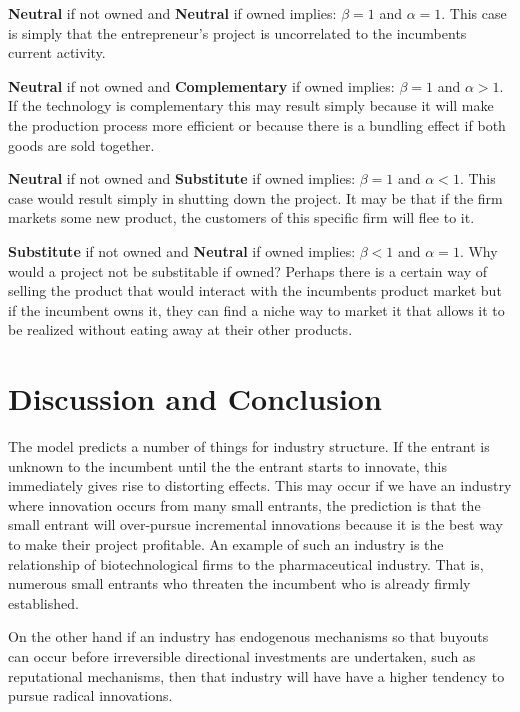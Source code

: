 \documentclass[11pt]{article}
\begin{document}
\textbf{Neutral} if not owned and \textbf{Neutral} if owned implies: $\beta=1$ and $\alpha=1$. This case is simply that the entrepreneur's project is uncorrelated to the incumbents current activity.  

\textbf{Neutral} if not owned and \textbf{Complementary} if owned implies: $\beta=1$ and $\alpha>1$. If the technology is complementary this may result simply because it will make the production process more efficient or because there is a bundling effect if both goods are sold together. 

\textbf{Neutral} if not owned and \textbf{Substitute} if owned implies: $\beta=1$ and $\alpha<1$. This case would result simply in shutting down the project. It may be that if the firm markets some new product, the customers of this specific firm will flee to it. 

\textbf{Substitute} if not owned and \textbf{Neutral} if owned implies: $\beta<1$ and $\alpha=1$. Why would a project not be substitable if owned? Perhaps there is a certain way of selling the product that would interact with the incumbents product market but if the incumbent owns it, they can find a niche way to market it that allows it to be realized without eating away at their other products.

\section*{Discussion and Conclusion}

The model predicts a number of things for industry structure. If the entrant is unknown to the incumbent until the the entrant starts to innovate, this immediately gives rise to distorting effects.  This may occur if we have an industry where innovation occurs from many small entrants, the prediction is that the small entrant will over-pursue incremental innovations because it is the best way to make their project profitable. An example of such an industry is the relationship of biotechnological firms to the pharmaceutical industry. That is, numerous small entrants who threaten the incumbent who is already firmly established. 

On the other hand if an industry has endogenous mechanisms so that buyouts can occur before irreversible directional investments are undertaken, such as reputational mechanisms, then that industry will have have a higher tendency to pursue radical innovations. 
\end{document}
